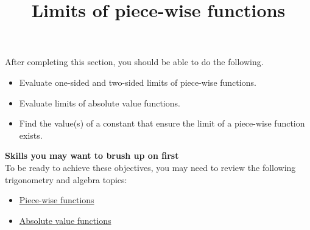 \documentclass{ximera}
\title{Limits of piece-wise functions}
\begin{document}
\begin{abstract}
\end{abstract}
\maketitle

\begin{sectionOutcomes}
After completing this section, you should be able to do the following. 

\begin{itemize}
\item Evaluate one-sided and two-sided limits of piece-wise functions.
\item Evaluate limits of absolute value functions. 
\item Find the value(s) of a constant that ensure the limit of a piece-wise function exists. 
\end{itemize}
\end{sectionOutcomes}

\phantom{text}%


\textbf{Skills you may want to brush up on first} \\ To be ready to achieve these objectives, you may need to review the following trigonometry and algebra topics: 
\begin{itemize}
    \item \href{https://ximera.osu.edu/math160fa17/m160prerequisites/PreRequisiteXards/U2CommonFunctions/2.4PieceWiseFunctions/titlePage}{Piece-wise functions}
    \item \href{https://ximera.osu.edu/math160fa17/m160prerequisites/PreRequisiteXards/U2CommonFunctions/2.5TheAbsoluteValueFunction/titlePage}{Absolute value functions}
\end{itemize}
\end{document}
